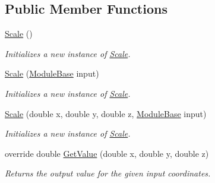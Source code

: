 \subsection*{Public Member Functions}
\begin{DoxyCompactItemize}
\item 
\hyperlink{class_lib_noise_1_1_operator_1_1_scale_a4a3a90968f2500708c960c11b56d2589}{Scale} ()
\begin{DoxyCompactList}\small\item\em Initializes a new instance of \hyperlink{class_lib_noise_1_1_operator_1_1_scale}{Scale}. \end{DoxyCompactList}\item 
\hyperlink{class_lib_noise_1_1_operator_1_1_scale_a039595fc2470dbac9c391c8bf91e2b2c}{Scale} (\hyperlink{class_lib_noise_1_1_module_base}{Module\+Base} input)
\begin{DoxyCompactList}\small\item\em Initializes a new instance of \hyperlink{class_lib_noise_1_1_operator_1_1_scale}{Scale}. \end{DoxyCompactList}\item 
\hyperlink{class_lib_noise_1_1_operator_1_1_scale_ae3ecdd0f77a86d870f2a227d27646b67}{Scale} (double x, double y, double z, \hyperlink{class_lib_noise_1_1_module_base}{Module\+Base} input)
\begin{DoxyCompactList}\small\item\em Initializes a new instance of \hyperlink{class_lib_noise_1_1_operator_1_1_scale}{Scale}. \end{DoxyCompactList}\item 
override double \hyperlink{class_lib_noise_1_1_operator_1_1_scale_ab2e2fbf1fda90a5af5839f79f9ab040b}{Get\+Value} (double x, double y, double z)
\begin{DoxyCompactList}\small\item\em Returns the output value for the given input coordinates. \end{DoxyCompactList}\end{DoxyCompactItemize}
